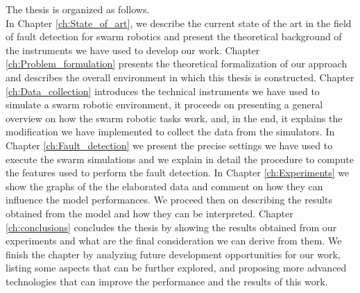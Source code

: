 \documentclass[../../Thesis.tex]{subfiles}
\begin{document}
	The thesis is organized as follows. \\
	In Chapter \ref{ch:State_of_art}, we describe the current state of the art in the field of fault detection for swarm robotics and present the theoretical background of the instruments we have used to develop our work. Chapter \ref{ch:Problem_formulation} presents the theoretical formalization of our approach and describes the overall environment in which this thesis is constructed. Chapter \ref{ch:Data_collection} introduces the technical instruments we have used to simulate a swarm robotic environment, it proceeds on presenting a general overview on how the swarm robotic tasks work, and, in the end, it explains the modification we have implemented to collect the data from the simulators. In Chapter \ref{ch:Fault_detection} we present the precise settings we have used to execute the swarm simulations and we explain in detail the procedure to compute the features used to perform the fault detection. In Chapter \ref{ch:Experiments} we show the graphs of the the elaborated data and comment on how they can influence the model performances. We proceed then on describing the results obtained from the model and how they can be interpreted. Chapter \ref{ch:conclusions} concludes the thesis by showing the results obtained from our experiments and what are the final consideration we can derive from them. We finish the chapter by analyzing future development opportunities for our work, listing some aspects that can be further explored, and proposing more advanced technologies that can improve the performance and the results of this work.
\end{document}

